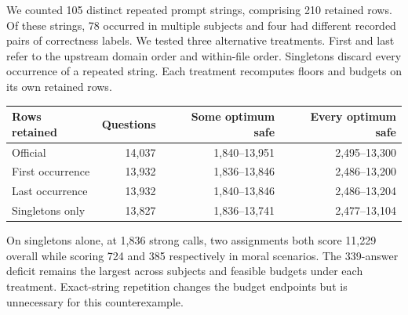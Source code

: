 We counted 105 distinct repeated prompt strings, comprising 210 retained rows. Of these strings, 78 occurred in multiple subjects and four had different recorded pairs of correctness labels. We tested three alternative treatments. First and last refer to the upstream domain order and within-file order. Singletons discard every occurrence of a repeated string. Each treatment recomputes floors and budgets on its own retained rows.

\begin{center}
\small
\begin{tabular}{lrrr}
\toprule
Rows retained & Questions & Some optimum safe & Every optimum safe\\
\midrule
Official & 14,037 & 1,840--13,951 & 2,495--13,300\\
First occurrence & 13,932 & 1,836--13,846 & 2,486--13,200\\
Last occurrence & 13,932 & 1,840--13,846 & 2,486--13,204\\
Singletons only & 13,827 & 1,836--13,741 & 2,477--13,104\\
\bottomrule
\end{tabular}
\end{center}

On singletons alone, at 1,836 strong calls, two assignments both score 11,229 overall while scoring 724 and 385 respectively in moral scenarios. The 339-answer deficit remains the largest across subjects and feasible budgets under each treatment. Exact-string repetition changes the budget endpoints but is unnecessary for this counterexample.
